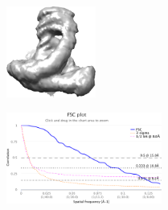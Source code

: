\begin{figure}[t]
    \vspace{1em}
    \begin{subfigure}[b]{0.23\linewidth}
        \caption*{}
    \end{subfigure}
    \hfill
    \begin{subfigure}[b]{0.18\linewidth}
        \caption*{}
    \end{subfigure}
    \hfill
    \begin{subfigure}[b]{0.23\linewidth}
        \centering
        \includegraphics[height=3cm]{figures/5j0n_fullcvg_uniformS2_noise16_apr.png}
        \caption{}\label{fig:5j0n-noise16-reconstruction-recovered}
    \end{subfigure}
    \hfill
    \begin{subfigure}[b]{0.31\linewidth}
        \centering
        \includegraphics[height=3cm]{figures/5j0n_fullcvg_uniformS2_noise16_FSC_apr_init.pdf}
        \caption{}
    \end{subfigure}


\end{figure}
